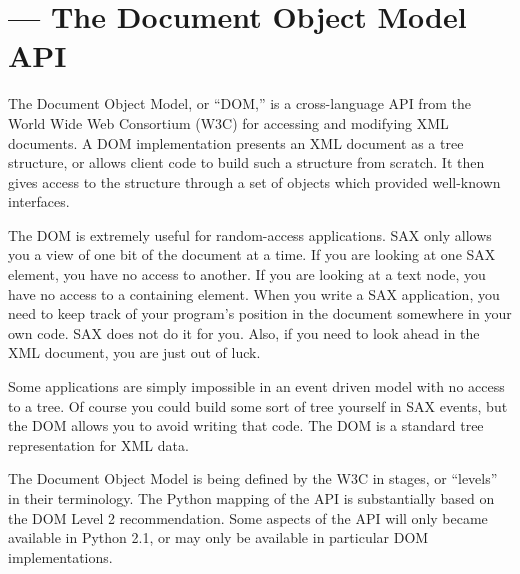 \section{ ---
         The Document Object Model API}



The Document Object Model, or ``DOM,'' is a cross-language API from
the World Wide Web Consortium (W3C) for accessing and modifying XML
documents.  A DOM implementation presents an XML document as a tree
structure, or allows client code to build such a structure from
scratch.  It then gives access to the structure through a set of
objects which provided well-known interfaces.

The DOM is extremely useful for random-access applications.  SAX only
allows you a view of one bit of the document at a time.  If you are
looking at one SAX element, you have no access to another.  If you are
looking at a text node, you have no access to a containing element.
When you write a SAX application, you need to keep track of your
program's position in the document somewhere in your own code.  SAX
does not do it for you.  Also, if you need to look ahead in the XML
document, you are just out of luck.

Some applications are simply impossible in an event driven model with
no access to a tree.  Of course you could build some sort of tree
yourself in SAX events, but the DOM allows you to avoid writing that
code.  The DOM is a standard tree representation for XML data.


The Document Object Model is being defined by the W3C in stages, or
``levels'' in their terminology.  The Python mapping of the API is
substantially based on the DOM Level 2 recommendation.  Some aspects
of the API will only became available in Python 2.1, or may only be
available in particular DOM implementations.

